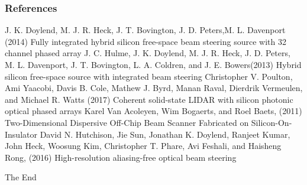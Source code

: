 \documentclass{beamer}
\begin{document}
\begin{frame}
\frametitle{References}
\footnotesize{
\begin{thebibliography}{99} %
 J. K. Doylend, M. J. R. Heck, J. T. Bovington, J. D. Peters,M. L. Davenport (2014)
\newblock Fully integrated hybrid silicon free-space beam steering source with 32 channel phased array
%
 J. C. Hulme, J. K. Doylend, M. J. R. Heck, J. D. Peters, M. L. Davenport, J. T. Bovington, L. A. Coldren, and J. E. Bowers(2013)
\newblock Hybrid silicon free-space source with integrated beam steering
%
 Christopher V.  Poulton, Ami Yaacobi,  Davis B. Cole, Mathew J. Byrd,  Manan Raval, Dierdrik Vermeulen,  and Michael R. Watts (2017)
\newblock Coherent solid-state LIDAR with silicon photonic optical phased arrays
%
 Karel Van Acoleyen, Wim Bogaerts, and Roel Baets, (2011)
\newblock Two-Dimensional Dispersive Off-Chip Beam Scanner Fabricated on Silicon-On-Insulator
%
 David N. Hutchison, Jie Sun, Jonathan K. Doylend, Ranjeet Kumar, John Heck, Woosung Kim, Christopher T. Phare, Avi Feshali, and Haisheng Rong, (2016)
\newblock High-resolution aliasing-free optical beam steering
\end{thebibliography}
}
\end{frame}


\begin{frame}
\Huge{\centerline{The End}}
\end{frame}

\end{document}
